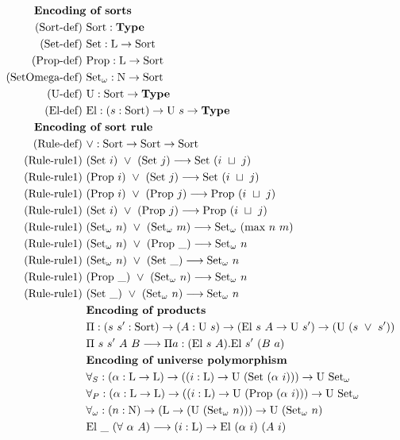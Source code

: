 \documentclass[]{StandardTemplate}
\begin{document}
\begin{alignat*}{2}  
  \text{\textbf{Encoding}}&\text{\textbf{ of sorts}}\\  
  \text{(Sort-def) }&\text{Sort} : \textbf{Type} \\
  \text{(Set-def) }&\text{Set} : \text{L} \to \text{Sort} \\
  \text{(Prop-def) }&\text{Prop} : \text{L} \to \text{Sort} \\  
  \text{(SetOmega-def) }&\text{Set}_\omega : \text{N} \to \text{Sort}\\
  \text{(U-def) }&\text{U} : \text{Sort} \to \textbf{Type}\\
  \text{(El-def) }&\text{El} : (s : \text{Sort}) \to \text{U}~s \to \textbf{Type}\\
  \text{\textbf{Encoding}}&\text{\textbf{ of sort rule}}\\
  \text{(Rule-def) }&\lor : \text{Sort} \to \text{Sort} \to \text{Sort}\\
  \text{(Rule-rule1) }&(\text{Set}~i)~\lor~(\text{Set}~j) \longrightarrow \text{Set}~(i~\sqcup~j)\\
  \text{(Rule-rule1) }&(\text{Prop}~i)~\lor~(\text{Set}~j) \longrightarrow \text{Set}~(i~\sqcup~j)\\
  \text{(Rule-rule1) }&(\text{Prop}~i)~\lor~(\text{Prop}~j) \longrightarrow \text{Prop}~(i~\sqcup~j)\\
  \text{(Rule-rule1) }&(\text{Set}~i)~\lor~(\text{Prop}~j) \longrightarrow \text{Prop}~(i~\sqcup~j)\\
  \text{(Rule-rule1) }&(\text{Set}_\omega~n)~\lor~(\text{Set}_\omega~m) \longrightarrow \text{Set}_\omega~(\text{max}~n~m)\\
  \text{(Rule-rule1) }&(\text{Set}_\omega~n)~\lor~(\text{Prop}~\_) \longrightarrow \text{Set}_\omega~n\\
  \text{(Rule-rule1) }&(\text{Set}_\omega~n)~\lor~(\text{Set}~\_) \longrightarrow \text{Set}_\omega~n\\
  \text{(Rule-rule1) }&(\text{Prop}~\_)~\lor~(\text{Set}_\omega~n) \longrightarrow \text{Set}_\omega~n\\
  \text{(Rule-rule1) }&(\text{Set}~\_)~\lor~(\text{Set}_\omega~n) \longrightarrow \text{Set}_\omega~n\\      
  &\text{\textbf{Encoding of products}}\\  
  &\Pi : (s~s' : \text{Sort}) \to (A : \text{U}~s) \to (\text{El}~s~A \to \text{U}~s') \to (\text{U}~(s~\lor~s'))\\
  &\Pi~s~s'~A~B \longrightarrow \Pi a : (\text{El}~s~A). \text{El}~s'~(B~a)\\
                          &\text{\textbf{Encoding of universe polymorphism}}\\
                          &\forall_S : (\alpha : \text{L} \to \text{L}) \to ((i : \text{L}) \to \text{U}~(\text{Set}~(\alpha~i)))\to \text{U}~\text{Set}_\omega\\
                          &\forall_P : (\alpha : \text{L} \to \text{L}) \to ((i : \text{L}) \to \text{U}~(\text{Prop}~(\alpha~i)))\to \text{U}~\text{Set}_\omega\\
                          &\forall_\omega : (n : \text{N}) \to (\text{L} \to (\text{U}~(\text{Set}_\omega~n)))\to \text{U}~(\text{Set}_\omega~n)\\  
&\text{El}~\_~(\forall~\alpha~A) \longrightarrow (i : \text{L}) \to \text{El}~(\alpha~i)~(A~i)
\end{alignat*}
\end{document}
